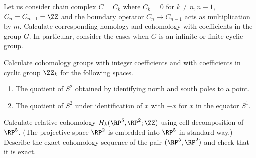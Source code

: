 




\exercises
\begin{xca}
Let us consider chain complex $C=C_k$ where $C_k=0$ for
$k\not=n,n-1$, $C_n=C_{n-1}=\ZZ$ and the boundary operator
$C_{n}\to C_{n-1}$ acts as multiplication by $m$. Calculate
corresponding homology and cohomology with coefficients in the
group $G$. In particular, consider the cases when $G$ is an
infinite or finite cyclic group.
\end{xca}
\begin{xca}
Calculate cohomology groups with integer coefficients and with
coefficients in cyclic group $\ZZ_k$ for the following spaces.
\begin{enumerate}
\item The quotient of $S^2$ obtained by identifying north and
  south poles to a point.
\item The quotient of $S^2$ under identification of $x$ with $-x$
  for $x$ in the equator $S^1$.
\end{enumerate}
\end{xca}
\begin{xca}
Calculate relative cohomology $H_k (\RP^5, \RP^2; \ZZ)$ using
cell decomposition of $\RP^5$. (The projective space $\RP^2$ is
embedded into $\RP^5$ in standard way.) Describe the exact
cohomology sequence of the pair $(\RP^5, \RP^2)$ and check that
it is exact.
\end{xca}

